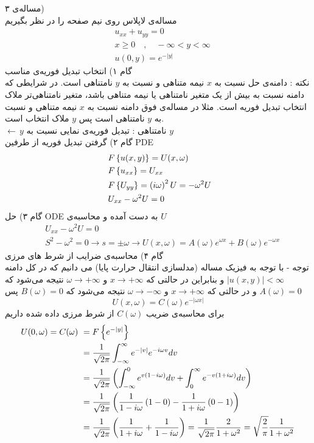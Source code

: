 مساله‌ی ۳)\\
مساله‌ی لاپلاس روی نیم صفحه را در نظر بگیریم
\begin{equation*}
	\begin{aligned}
		&\
		u_{xx}+u_{yy}=0
		\\ &\
		x\ge0\quad , \quad -\infty<y<\infty
		\\ &\
		u(0,y)=e^{-\left|y\right|}
	\end{aligned}
\end{equation*}
گام ۱) انتخاب تبدیل فوریه‌ی مناسب\\
نکته : دامنه‌ی حل نسبت به
$x$
نیمه متناهی و نسبت به
$y$
نا‌متناهی است. در شرایطی که دامنه نسبت به بیش از یک متغیر نا‌متناهی یا نیمه متناهی باشد، متغیر نا‌متناهی‌تر ملاک انتخاب تبدیل فوریه است. مثلا در مساله‌ی فوق دامنه نسبت به
$x$
نیمه متناهی و نسبت به
$y$
نا‌متناهی است پس 
$y$
ملاک انتخاب است.\\
$\leftarrow \, y$
نامتناهی : تبدیل فوریه‌ی نمایی نسبت به
$y$\\
گام ۲) گرفتن تبدیل فوریه از طرفین PDE
\begin{equation*}
	\begin{aligned}
		&\
		F\left\{u(x,y)\right\}=U(x,\omega)
		\\ &\
		F\left\{u_{xx}\right\}=U_{xx}
		\\ &\
		F\left\{U_{yy}\right\}=\left(i\omega\right)^2U=-\omega^2U
		\\ &\
		U_{xx}-\omega^2U=0
	\end{aligned}
\end{equation*}
گام ۳) حل ODE به دست آمده و محاسبه‌ی 
$U$
\begin{equation*}
	\begin{aligned}
		&\
		U_{xx}-\omega^2 U=0
		\\ &\
		S^2-\omega^2=0\rightarrow s=\pm\omega\rightarrow U(x,\omega)=A(\omega)e^{\omega x}+B(\omega)e^{-\omega x}
	\end{aligned}
\end{equation*}
گام ۴) محاسبه‌ی ضرایب از شرط های مرزی\\
توجه - با توجه به فیزیک مساله (مدلسازی انتقال حرارت پایا) می دانیم که در کل دامنه
$\left|u(x,y)\right|<\infty$
و بنابراین در حالتی که
$x\to+\infty$
و
$\omega\to+\infty$
نتیجه می‌شود که
$A(\omega)=0$
و در حالتی که
$x\to+\infty$
و
$\omega\to-\infty$
نتیجه می‌شود که
$B(\omega)=0$
پس
\[
U(x,\omega)=C(\omega)e^{-\left|\omega x\right|}
\]
برای محاسبه‌ی ضریب
$C(\omega)$
از شرط مرزی داده شده داریم
\begin{equation*}
	\begin{aligned}
		U(0,\omega)=C(\omega) &\ =F\left\{e^{-\left|y\right|}\right\}
		\\ &\
		=\frac1{\sqrt{2\pi}}\int_{-\infty}^\infty e^{-\left|v\right|}e^{-i\omega v}dv
		\\ &\
		=\frac1{\sqrt{2\pi}}\left(\int_{-\infty}^0e^{v\left(1-i\omega\right)}dv+\int_0^\infty e^{-v\left(1+i\omega\right)}dv\right)
		\\ &\
		=\frac1{\sqrt{2\pi}}\left(\frac1{1-i\omega}\left(1-0\right)-\frac1{1+i\omega}\left(0-1\right)\right)
		\\ &\
		=\frac1{\sqrt{2\pi}}\left(\frac1{1+i\omega}+\frac1{1-i\omega}\right)=\frac1{\sqrt{2\pi}}\frac2{1+\omega^2}=\sqrt\frac2\pi\frac1{1+\omega^2}
	\end{aligned}
\end{equation*}

